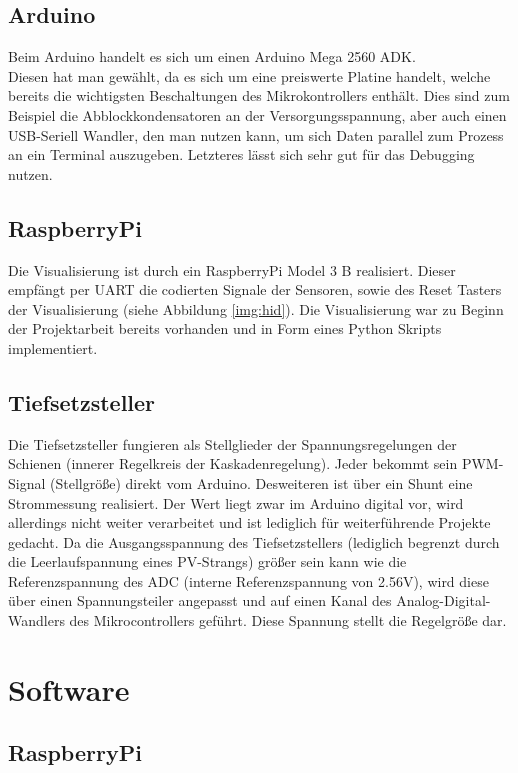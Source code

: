 \documentclass[a4paper, 11pt]{report}
\begin{document}
	\section{Arduino}
		Beim Arduino handelt es sich um einen Arduino Mega 2560 ADK.\\
		Diesen hat man gewählt, da es sich um eine preiswerte Platine handelt, welche bereits die wichtigsten Beschaltungen des Mikrokontrollers enthält.
		Dies sind zum Beispiel die Abblockkondensatoren an der Versorgungsspannung, aber auch einen USB-Seriell Wandler, den man nutzen kann, um sich Daten parallel zum Prozess an ein Terminal auszugeben.
		Letzteres lässt sich sehr gut für das Debugging nutzen.
	\section{RaspberryPi}
		Die Visualisierung ist durch ein RaspberryPi Model 3 B realisiert. Dieser empfängt per UART die codierten Signale der Sensoren, sowie des Reset Tasters der Visualisierung (siehe Abbildung \ref{img:hid}).
		Die Visualisierung war zu Beginn der Projektarbeit bereits vorhanden und in Form eines Python Skripts implementiert.
	\section{Tiefsetzsteller}
		Die Tiefsetzsteller fungieren als Stellglieder der Spannungsregelungen der Schienen (innerer Regelkreis der Kaskadenregelung).
		Jeder bekommt sein PWM-Signal (Stellgröße) direkt vom Arduino. Desweiteren ist über ein Shunt eine Strommessung realisiert.
		Der Wert liegt zwar im Arduino digital vor, wird allerdings nicht weiter
		verarbeitet und ist lediglich für weiterführende Projekte gedacht.
		Da die Ausgangsspannung des Tiefsetzstellers (lediglich begrenzt durch die Leerlaufspannung eines PV-Strangs) größer sein kann wie die Referenzspannung des ADC (interne Referenzspannung von 2.56V), wird diese über einen Spannungsteiler angepasst und auf einen Kanal des Analog-Digital-Wandlers des Mikrocontrollers geführt.
		Diese Spannung stellt die Regelgröße dar.
	\newpage

\chapter{Software}
	\section{RaspberryPi}
\end{document}
